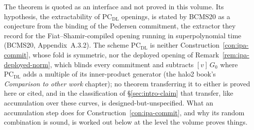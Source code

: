 \documentclass[11pt,a4paper]{article}
\theoremstyle{definition}
\begin{document}
The theorem is quoted as an interface and not proved in this volume.
Its hypothesis, the extractability of $\mathrm{PC}_{\mathrm{DL}}$
openings, is stated by BCMS20 as a conjecture from the binding of the
Pedersen commitment, the extractor they record for the
Fiat--Shamir-compiled opening running in superpolynomial time
(BCMS20, Appendix~A.3.2). The scheme $\mathrm{PC}_{\mathrm{DL}}$ is
neither Construction~\ref{con:ipa-commit}, whose fold is symmetric, nor
the deployed opening of Remark~\ref{rem:ipa-deployed-norm}, which blinds
every commitment and subtracts $[v]\,G_0$ where
$\mathrm{PC}_{\mathrm{DL}}$ adds a multiple of its inner-product
generator (the halo2 book's \emph{Comparison to other work} chapter); no theorem
transferring it to either is proved here or cited, and in the
classification of \S\ref{sec:intro-claim} that transfer, like
accumulation over these curves, is designed-but-unspecified. What an
accumulation step does for Construction~\ref{con:ipa-commit}, and why
its random combination is sound, is worked out below at the level the
volume proves things.
\end{document}
